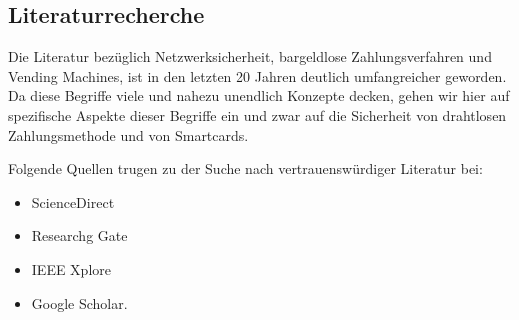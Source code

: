 \subsection{Literaturrecherche}

Die Literatur bezüglich Netzwerksicherheit, bargeldlose Zahlungsverfahren und Vending Machines, ist in den letzten 20 
Jahren deutlich umfangreicher geworden. Da diese Begriffe viele und nahezu unendlich Konzepte decken, gehen wir hier
auf spezifische Aspekte dieser Begriffe ein und zwar auf die Sicherheit von drahtlosen Zahlungsmethode und von 
Smartcards. 

Folgende Quellen trugen zu der Suche nach vertrauenswürdiger Literatur bei:

\begin{itemize}
    \item ScienceDirect
    \item Researchg Gate
    \item IEEE Xplore
    \item Google Scholar.
\end{itemize}

